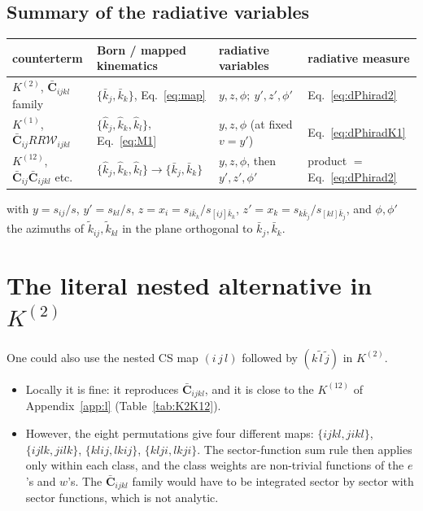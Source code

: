 \documentclass[11pt,a4paper]{article}
\newcommand{\bbC}[1]{\bar{\mathbf C}_{#1}}
\newcommand{\RR}{RR}
\newcommand{\W}[1]{\mathcal W_{#1}}
\newcommand{\jb}{\bar k_{j}}
\newcommand{\kb}{\bar k_{k}}
\newcommand{\jh}{\hat k_{j}}
\newcommand{\kh}{\hat k_{k}}
\newcommand{\lh}{\hat k_{l}}
\begin{document}
\subsection{Summary of the radiative variables}
\begin{center}
\renewcommand{\arraystretch}{1.25}
\begin{tabular}{llll}\toprule
counterterm & Born / mapped kinematics & radiative variables & radiative measure\\\midrule
$K^{(2)}$, $\bbC{ijkl}$ family & $\{\jb,\kb\}$, Eq.~\eqref{eq:map} & $y,z,\phi;\ y',z',\phi'$ & Eq.~\eqref{eq:dPhirad2}\\
$K^{(1)}$, $\bbC{ij}\RR\W{ijkl}$ & $\{\jh,\kh,\lh\}$, Eq.~\eqref{eq:M1} & $y,z,\phi$ (at fixed $v=y'$) & Eq.~\eqref{eq:dPhiradK1}\\
$K^{(12)}$, $\bbC{ij}\bbC{ijkl}$ etc. & $\{\jh,\kh,\lh\}\to\{\jb,\kb\}$ & $y,z,\phi$, then $y',z',\phi'$ & product $=$ Eq.~\eqref{eq:dPhirad2}\\\bottomrule
\end{tabular}
\end{center}
with $y=s_{ij}/s$, $y'=s_{kl}/s$, $z=x_i=s_{i\kb}/s_{[ij]\kb}$, $z'=x_k=s_{k\jb}/s_{[kl]\jb}$, and $\phi,\phi'$ the azimuths of $\tilde k_{ij},\tilde k_{kl}$ in the plane orthogonal to $\jb,\kb$.

\section{The literal nested alternative in $K^{(2)}$}
\label{sec:nested}
One could also use the nested CS map $(i\,j\,l)$ followed by $(k\,\tilde l\,\tilde j)$ in $K^{(2)}$.
\begin{itemize}
\item Locally it is fine: it reproduces $\bbC{ijkl}$, and it is close to the $K^{(12)}$ of
Appendix~\ref{app:l} (Table~\ref{tab:K2K12}).
\item However, the eight permutations give four different maps:
$\{ijkl,jikl\}$, $\{ijlk,jilk\}$, $\{klij,lkij\}$, $\{klji,lkji\}$.
The sector-function sum rule then applies only within each class, and the class weights are
non-trivial functions of the $e$'s and $w$'s. The $\bbC{ijkl}$ family would have to be integrated
sector by sector with sector functions, which is not analytic.
\end{itemize}
\end{document}
